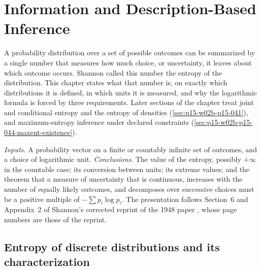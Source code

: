 \chapter{Information and Description-Based Inference}
\label{sec:p15-w02b-p15-040-information}

A probability distribution over a set of possible outcomes can be
summarized by a single number that measures how much choice, or
uncertainty, it leaves about which outcome occurs. Shannon called this
number the entropy of the distribution. This chapter states what that
number is, on exactly which distributions it is defined, in which units
it is measured, and why the logarithmic formula is forced by three
requirements. Later sections of the chapter treat joint and conditional
entropy and the entropy of densities
(\cref{sec:p15-w02b-p15-041}), and maximum-entropy inference under
declared constraints (\cref{sec:p15-w02b-p15-044-maxent-existence}).

\emph{Inputs.} A probability vector on a finite or countably infinite
set of outcomes, and a choice of logarithmic unit. \emph{Conclusions.}
The value of the entropy, possibly \(+\infty\) in the countable case;
its conversion between units; its extreme values; and the theorem that
a measure of uncertainty that is continuous, increases with the number
of equally likely outcomes, and decomposes over successive choices must
be a positive multiple of \(-\sum p_i\log p_i\). The presentation
follows Section~6 and Appendix~2 of Shannon's corrected reprint of the
1948 paper \cite[pp.~10--12, 28--29]{Shannon1948MathematicalTheory},
whose page numbers are those of the reprint.

\section{Entropy of discrete distributions and its characterization}
\label{sec:p15-w02b-p15-040-discrete}

